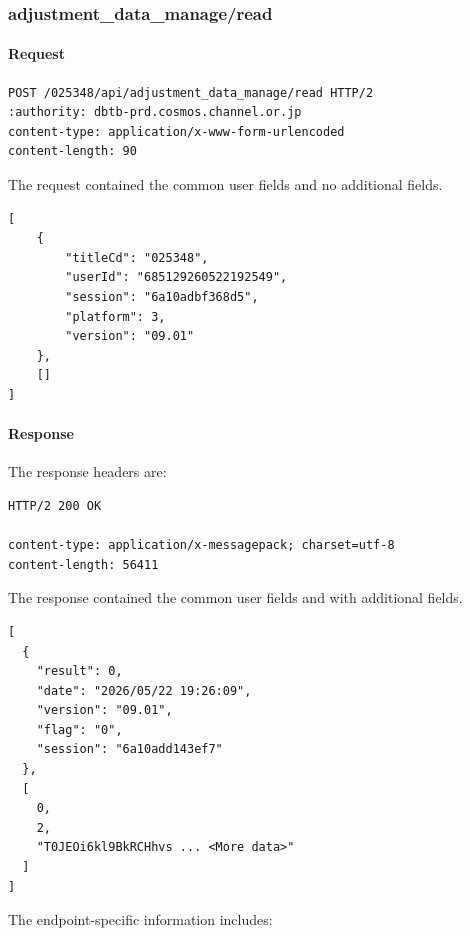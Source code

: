 \subsubsection{adjustment\_data\_manage/read}
\label{subsec:api_adjustment_data_manage_read}

\paragraph{Request}

\begin{lstlisting}
POST /025348/api/adjustment_data_manage/read HTTP/2
:authority: dbtb-prd.cosmos.channel.or.jp
content-type: application/x-www-form-urlencoded
content-length: 90
\end{lstlisting}

The request contained the common user fields and no additional fields.

\begin{lstlisting}
[
    {
        "titleCd": "025348",
        "userId": "685129260522192549",
        "session": "6a10adbf368d5",
        "platform": 3,
        "version": "09.01"
    },
    []
]
\end{lstlisting}

\newpage

\paragraph{Response}

The response headers are:

\begin{lstlisting}
HTTP/2 200 OK

content-type: application/x-messagepack; charset=utf-8
content-length: 56411
\end{lstlisting}

The response contained the common user fields and with additional fields.

\begin{lstlisting}
[
  {
    "result": 0,
    "date": "2026/05/22 19:26:09",
    "version": "09.01",
    "flag": "0",
    "session": "6a10add143ef7"
  },
  [
    0,
    2,
    "T0JEOi6kl9BkRCHhvs ... <More data>"
  ]
]
\end{lstlisting}

The endpoint-specific information includes:

